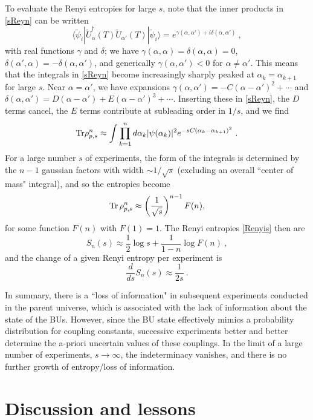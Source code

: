\documentclass[11pt]{article}
\numberwithin{equation}{section}
\newcommand{\beq}{\begin{equation}}
\newcommand{\eeq}{\end{equation}}
\newcommand{\Tr}{{\rm Tr}}
\begin{document}
To evaluate the Renyi entropies for large $s$, note that
the inner products in \eqref{sReyn} can be written
\beq
\langle \tilde \psi_i| \tilde U^\dagger_{\alpha}(T) \tilde U_{\alpha'}(T) |\tilde \psi_i\rangle = e^{\gamma(\alpha,\alpha')+i \delta(\alpha,\alpha')}\ ,
\eeq
with real functions $\gamma$ and $\delta$; we have $\gamma(\alpha,\alpha)=\delta(\alpha,\alpha)=0$, $\delta(\alpha',\alpha)= -\delta(\alpha,\alpha')$, and generically $\gamma(\alpha,\alpha')<0$ for $\alpha\neq\alpha'$.  This means that the integrals in \eqref{sReyn} become increasingly sharply peaked at $\alpha_k=\alpha_{k+1}$ for large $s$.  
Near $\alpha=\alpha'$, we have  expansions $\gamma(\alpha,\alpha') = -C(\alpha-\alpha')^2 +\cdots$ and $\delta(\alpha,\alpha') = D(\alpha-\alpha') + E(\alpha-\alpha')^3 + \cdots$.  Inserting these in \eqref{sReyn}, the $D$ terms cancel, the $E$ terms contribute at subleading order in $1/s$, and we find
\beq
\Tr \rho_{p,s}^n \approx \int\prod_{k=1}^n  d\alpha_k | \psi(\alpha_k)|^2  e^{-sC(\alpha_k-\alpha_{k+1})^2} \ .
\eeq
For a large number  $s$ of experiments, the form of the integrals is determined by the $n-1$ gaussian factors with width $\sim 1/\sqrt s$ (excluding an overall ``center of mass" integral), and so the entropies become
\beq
\Tr\, \rho_{p,s}^n \approx \left(\frac{1}{\sqrt s}\right)^{n-1} F(n), 
\eeq
for some function $F(n)$ with $F(1)=1$.  
The Renyi entropies \eqref{Renyis} then are
\beq
S_n(s) \approx \frac{1}{2} \log s + \frac{1}{1-n} \log F(n)\ ,
\eeq
and the change of a given Renyi entropy per experiment is 
\beq
\frac{d}{ds} S_n(s) \approx \frac{1}{2s}\ .
\eeq

In summary, there is a ``loss of information" in subsequent experiments conducted in the parent universe, which is associated with the lack of information about the state of the BUs.  However, since the BU state effectively mimics a probability distribution for coupling constants, successive experiments better and better determine the a-priori uncertain values of these couplings.  In the limit of a large number of experiments, $s\rightarrow\infty$, the indeterminacy vanishes, and there is no further growth of entropy/loss of information.


\section{Discussion and lessons}
\end{document}
